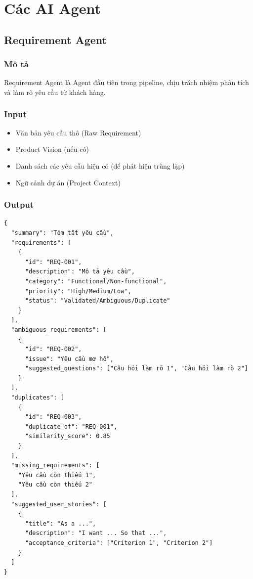 \documentclass[12pt,a4paper]{report}
\begin{document}
\section{Các AI Agent}

\subsection{Requirement Agent}

\subsubsection{Mô tả}

Requirement Agent là Agent đầu tiên trong pipeline, chịu trách nhiệm phân tích và làm rõ yêu cầu từ khách hàng.

\subsubsection{Input}

\begin{itemize}
\item Văn bản yêu cầu thô (Raw Requirement)
\item Product Vision (nếu có)
\item Danh sách các yêu cầu hiện có (để phát hiện trùng lặp)
\item Ngữ cảnh dự án (Project Context)
\end{itemize}

\subsubsection{Output}

\begin{verbatim}
{
  "summary": "Tóm tắt yêu cầu",
  "requirements": [
    {
      "id": "REQ-001",
      "description": "Mô tả yêu cầu",
      "category": "Functional/Non-functional",
      "priority": "High/Medium/Low",
      "status": "Validated/Ambiguous/Duplicate"
    }
  ],
  "ambiguous_requirements": [
    {
      "id": "REQ-002",
      "issue": "Yêu cầu mơ hồ",
      "suggested_questions": ["Câu hỏi làm rõ 1", "Câu hỏi làm rõ 2"]
    }
  ],
  "duplicates": [
    {
      "id": "REQ-003",
      "duplicate_of": "REQ-001",
      "similarity_score": 0.85
    }
  ],
  "missing_requirements": [
    "Yêu cầu còn thiếu 1",
    "Yêu cầu còn thiếu 2"
  ],
  "suggested_user_stories": [
    {
      "title": "As a ...",
      "description": "I want ... So that ...",
      "acceptance_criteria": ["Criterion 1", "Criterion 2"]
    }
  ]
}
\end{verbatim}
\end{document}
